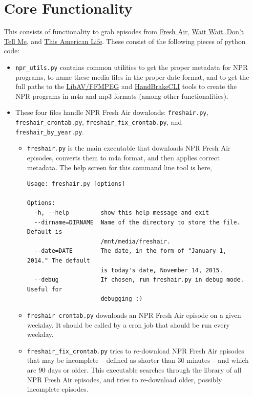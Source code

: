 \documentclass[]{article}
\begin{document}
\section{Core Functionality}\label{sec:core_functionality}
This consists of functionality to grab episodes from \href{http://www.npr.org/programs/fresh-air/}{Fresh Air},  \href{http://www.npr.org/programs/wait-wait-dont-tell-me/}{Wait Wait..Don't Tell Me}, and \href{http://www.thisamericanlife.org/}{This American Life}. These consist of the following pieces of python code:
\begin{itemize}
  \item {\verb|npr_utils.py|} contains common utilities to get the proper metadata for NPR programs, to name these media files in the proper date format, and to get the full paths to the \href{https://libav.org}{LibAV/FFMPEG} and \href{https://handbrake.fr/}{HandBrakeCLI} tools to create the NPR programs in m4a and mp3 formats (among other functionalities).
  
  \item These four files handle NPR Fresh Air downloads: {\verb|freshair.py|}, {\verb|freshair_crontab.py|}, {\verb|freshair_fix_crontab.py|}, and {\verb|freshair_by_year.py|}.
  \begin{itemize}
  \item {\verb|freshair.py|} is the main executable that downloads NPR Fresh Air episodes, converts them to m4a format, and then applies correct metadata. The help screen for this command line tool is here,
\begin{verbatim}
Usage: freshair.py [options]

Options:
  -h, --help         show this help message and exit
  --dirname=DIRNAME  Name of the directory to store the file. Default is
                     /mnt/media/freshair.
  --date=DATE        The date, in the form of "January 1, 2014." The default
                     is today's date, November 14, 2015.
  --debug            If chosen, run freshair.py in debug mode. Useful for
                     debugging :)
\end{verbatim}
    
    \item {\verb|freshair_crontab.py|} downloads an NPR Fresh Air episode on a given weekday. It should be called by a cron job that should be run every weekday.
    
    \item {\verb|freshair_fix_crontab.py|} tries to re-download NPR Fresh Air episodes that may be incomplete -- defined as shorter than 30 minutes -- and which are 90 days or older. This executable searches through the library of all NPR Fresh Air episodes, and tries to re-download older, possibly incomplete episodes.
    

\end{itemize}
\end{itemize}
\end{document}
